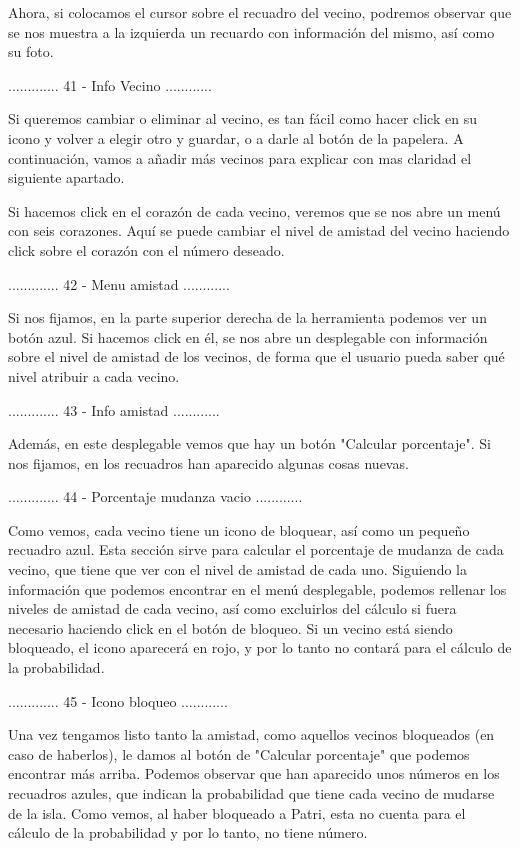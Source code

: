Ahora, si colocamos el cursor sobre el recuadro del vecino, podremos observar que se nos muestra a la
izquierda un recuardo con información del mismo, así como su foto.

............. 41 - Info Vecino ............

Si queremos cambiar o eliminar al vecino, es tan fácil como hacer click en su icono y volver a elegir
otro y guardar, o a darle al botón de la papelera. A continuación, vamos a añadir más vecinos para
explicar con mas claridad el siguiente apartado.

Si hacemos click en el corazón de cada vecino, veremos que se nos abre un menú con seis corazones. 
Aquí se puede cambiar el nivel de amistad del vecino haciendo click sobre el corazón con el número
deseado.

............. 42 - Menu amistad ............

Si nos fijamos, en la parte superior derecha de la herramienta podemos ver un botón azul. Si hacemos click en él,
se nos abre un desplegable con información sobre el nivel de amistad de los vecinos, de forma que el 
usuario pueda saber qué nivel atribuir a cada vecino.

............. 43 - Info amistad ............

Además, en este desplegable vemos que hay un botón "Calcular porcentaje". Si nos fijamos, en los
recuadros han aparecido algunas cosas nuevas.

............. 44 - Porcentaje mudanza vacio ............

Como vemos, cada vecino tiene un icono de bloquear, así como un pequeño recuadro azul. Esta sección sirve
para calcular el porcentaje de mudanza de cada vecino, que tiene que ver con el nivel de amistad de cada
uno. Siguiendo la información que podemos encontrar en el menú desplegable, podemos rellenar los niveles
de amistad de cada vecino, así como excluirlos del cálculo si fuera necesario haciendo click en el botón de
bloqueo. Si un vecino está siendo bloqueado, el icono aparecerá en rojo, y por lo tanto no contará para
el cálculo de la probabilidad.

............. 45 - Icono bloqueo ............

Una vez tengamos listo tanto la amistad, como aquellos vecinos bloqueados (en caso de haberlos),
le damos al botón de "Calcular porcentaje" que podemos encontrar más arriba. Podemos observar
que han aparecido unos números en los recuadros azules, que indican la probabilidad que tiene cada 
vecino de mudarse de la isla. Como vemos, al haber bloqueado a Patri, esta no cuenta para el cálculo
de la probabilidad y por lo tanto, no tiene número.

